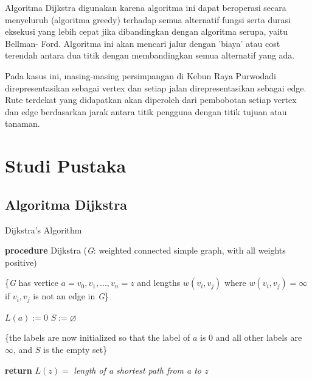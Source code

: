 \documentclass[conference]{IEEEtran}
\begin{document}
Algoritma Dijkstra digunakan karena algoritma ini dapat
beroperasi secara menyeluruh (algoritma greedy) terhadap
semua alternatif fungsi serta durasi eksekusi yang lebih cepat
jika dibandingkan dengan algoritma serupa, yaitu Bellman-
Ford. Algoritma ini akan mencari jalur dengan ’biaya’ atau
cost terendah antara dua titik dengan membandingkan semua
alternatif yang ada.

Pada kasus ini, masing-masing persimpangan di Kebun
Raya Purwodadi direpresentasikan sebagai vertex dan setiap
jalan direpresentasikan sebagai edge. Rute terdekat yang didapatkan
akan diperoleh dari pembobotan setiap vertex dan edge
berdasarkan jarak antara titik pengguna dengan titik tujuan
atau tanaman.

\section{Studi Pustaka}

\subsection{ Algoritma Dijkstra}

\begin{algorithm}
    \caption{Dijkstra's Algorithm}
    \SetAlgoLined
    \DontPrintSemicolon
   
    \textbf{procedure} Dijkstra (\textit{G}: weighted connected simple graph, with all weights positive)
    
    \{\textit{G} has vertice $a = v_0, v_1, ..., v_n = z$ and lengths $w(v_i, v_j)$ where $w(v_i, v_j) = \infty$ if $v_i, v_j$ is not an edge in \textit{G}\}
    
    $L(a) := 0$\;
    $S := \varnothing$

    \{the labels are now initialized so that the label of $a$ is 0 and all other labels are $\infty$, and $S$ is the empty set\}

    \textbf{return} $L(z)=$ \textit{length of a shortest path from a to z}
    
\end{algorithm}
\end{document}
